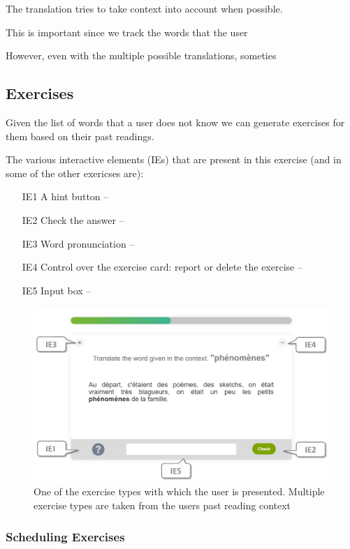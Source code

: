 The translation tries to take context into account when possible. 


This is important since we track the words that the user 


However, even with the multiple possible translations, someties 


\subsection {Exercises}

Given the list of words that a user does not know we can generate exercises for them based on their past readings.

The various interactive elements (IEs) that are present in this exercise (and in some of the other exericses are): 

\begin{itemize}
	\item [IE1] A hint button --
	\item [IE2] Check the answer -- 
	\item [IE3] Word pronunciation -- 
	\item [IE4] Control over the exercise card: report or delete the exercise -- 
	\item [IE5] Input box -- 
\end{itemize}

\begin{figure}[h!]
\centering
  \includegraphics[width=\columnwidth]{figures/exercise_translate}
  \caption{One of the exercise types with which the user is presented. Multiple exercise types are taken from the users past reading context}
\end{figure}



\subsubsection{Scheduling Exercises}

